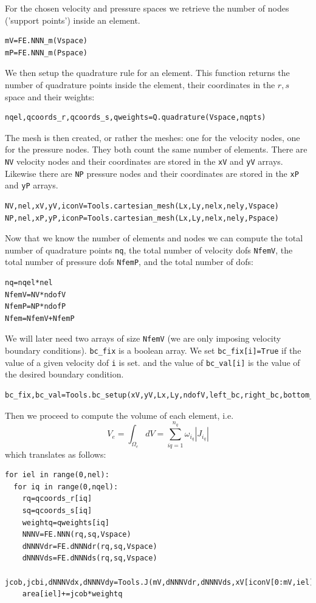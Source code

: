 For the chosen velocity and pressure spaces we retrieve the number of nodes 
('support points') inside an element.
\begin{lstlisting}
mV=FE.NNN_m(Vspace)
mP=FE.NNN_m(Pspace)
\end{lstlisting}

We then setup the quadrature rule for an element. This function 
returns the number of quadrature points inside the element, 
their coordinates in the $r,s$ space and their weights: 
\begin{lstlisting}
nqel,qcoords_r,qcoords_s,qweights=Q.quadrature(Vspace,nqpts)
\end{lstlisting}

The mesh is then created, or rather the meshes: one for the 
velocity nodes, one for the pressure nodes. They both count the 
same number of elements. There are \lstinline{NV} velocity nodes and their
coordinates are stored in the \lstinline{xV} and \lstinline{yV} arrays.
Likewise there are \lstinline{NP} pressure nodes and their
coordinates are stored in the \lstinline{xP} and \lstinline{yP} arrays. 

\begin{lstlisting}
NV,nel,xV,yV,iconV=Tools.cartesian_mesh(Lx,Ly,nelx,nely,Vspace)
NP,nel,xP,yP,iconP=Tools.cartesian_mesh(Lx,Ly,nelx,nely,Pspace)
\end{lstlisting}

Now that we know the number of elements and nodes we can compute the 
total number of quadrature points \lstinline{nq}, 
the total number of velocity dofs \lstinline{NfemV}, 
the total number of pressure dofs \lstinline{NfemP}, 
and the total number of dofs:

\begin{lstlisting}
nq=nqel*nel
NfemV=NV*ndofV
NfemP=NP*ndofP
Nfem=NfemV+NfemP
\end{lstlisting}

We will later need two arrays of size \lstinline{NfemV} (we are only imposing
velocity boundary conditions). \lstinline{bc_fix} is a boolean array.
We set \lstinline{bc_fix[i]=True} if the value of a given velocity dof \lstinline{i} is set. 
and the value of \lstinline{bc_val[i]} is the value of the desired boundary condition.

\begin{lstlisting}
bc_fix,bc_val=Tools.bc_setup(xV,yV,Lx,Ly,ndofV,left_bc,right_bc,bottom_bc,top_bc)
\end{lstlisting}

Then we proceed to compute the volume of each element, i.e. 
\[
V_e = \int_{\Omega_e} dV = \sum_{iq=1}^{n_q} \omega_{i_q} |J_{i_q}|
\]
which translates as follows: 
\begin{lstlisting}
for iel in range(0,nel):
  for iq in range(0,nqel):
    rq=qcoords_r[iq]
    sq=qcoords_s[iq]
    weightq=qweights[iq]
    NNNV=FE.NNN(rq,sq,Vspace)
    dNNNVdr=FE.dNNNdr(rq,sq,Vspace)
    dNNNVds=FE.dNNNds(rq,sq,Vspace)
    jcob,jcbi,dNNNVdx,dNNNVdy=Tools.J(mV,dNNNVdr,dNNNVds,xV[iconV[0:mV,iel]],yV[iconV[0:mV,iel]])
    area[iel]+=jcob*weightq
\end{lstlisting}



